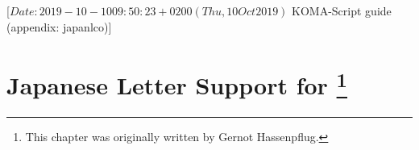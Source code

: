 %
%
%
%
%
%
%
%
% 
%
%
%
%
%
%

                 [$Date: 2019-10-10 09:50:23 +0200 (Thu, 10 Oct 2019) $
                  KOMA-Script guide (appendix: japanlco)]

\appendix

\chapter[{Japanese Letter Support for \Class{scrlttr2}}]
{Japanese Letter Support for \footnote{This chapter was
    originally written by Gernot Hassenpflug.}}

